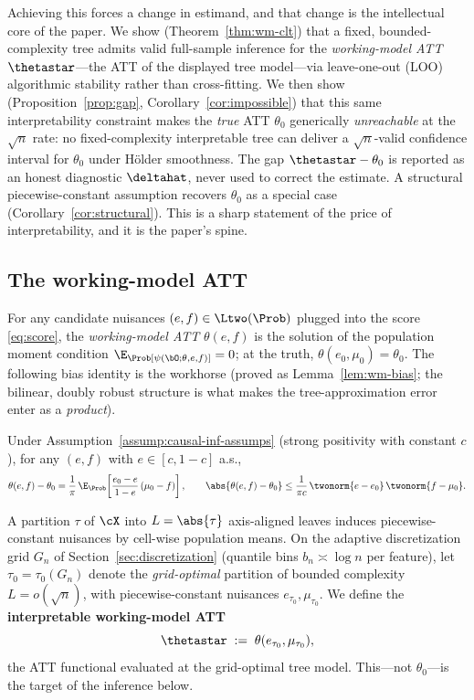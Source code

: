 Achieving this forces a change in estimand, and that change is the intellectual core
of the paper. We show (Theorem~\ref{thm:wm-clt}) that a fixed, bounded-complexity tree
admits valid full-sample inference for the \emph{working-model ATT} $\thetastar$---the
ATT of the displayed tree model---via leave-one-out (LOO) algorithmic stability
\citep{chen2022dml} rather than cross-fitting. We then show
(Proposition~\ref{prop:gap}, Corollary~\ref{cor:impossible}) that this same
interpretability constraint makes the \emph{true} ATT $\theta_0$ generically
\emph{unreachable} at the $\sqrt{n}$ rate: no fixed-complexity interpretable tree can
deliver a $\sqrt{n}$-valid confidence interval for $\theta_0$ under H\"older smoothness.
The gap $\thetastar - \theta_0$ is reported as an honest diagnostic $\deltahat$, never
used to correct the estimate. A structural piecewise-constant assumption recovers
$\theta_0$ as a special case (Corollary~\ref{cor:structural}). This is a sharp
statement of the price of interpretability, and it is the paper's spine.

\subsection{The working-model ATT}
\label{sec:wm-estimand}

For any candidate nuisances $(e, f) \in \Ltwo(\Prob)$ plugged into the score
\eqref{eq:score}, the \emph{working-model ATT} $\theta(e, f)$ is the solution of the
population moment condition $\E_\Prob[\psi(\bO; \theta, e, f)] = 0$; at the truth,
$\theta(e_0, \mu_0) = \theta_0$. The following bias identity is the workhorse
(proved as Lemma~\ref{lem:wm-bias}; the bilinear, doubly robust structure is what
makes the tree-approximation error enter as a \emph{product}).

\begin{lemma}
\label{lem:wm-bias}
Under Assumption~\ref{assump:causal-inf-assumps} (strong positivity with constant
$c$), for any $(e, f)$ with $e \in [c, 1-c]$ a.s.,
\begin{equation}
\label{eq:wm-bias}
\theta(e, f) - \theta_0
  = \frac{1}{\pi}\, \E_\Prob\!\left[ \frac{e_0 - e}{1 - e}\,(\mu_0 - f) \right],
\qquad
\abs{\theta(e, f) - \theta_0}
  \le \frac{1}{\pi c}\, \twonorm{e - e_0}\, \twonorm{f - \mu_0}.
\end{equation}
\end{lemma}

A partition $\tau$ of $\cX$ into $L = \abs{\tau}$ axis-aligned leaves induces
piecewise-constant nuisances by cell-wise population means. On the adaptive
discretization grid $G_n$ of Section~\ref{sec:discretization} (quantile bins
$b_n \asymp \log n$ per feature), let $\tau_0 = \tau_0(G_n)$ denote the
\emph{grid-optimal} partition of bounded complexity $L = o(\sqrt{n})$, with
piecewise-constant nuisances $e_{\tau_0}, \mu_{\tau_0}$. We define the
\textbf{interpretable working-model ATT}
\begin{equation}
\label{eq:thetastar}
\thetastar \;:=\; \theta(e_{\tau_0}, \mu_{\tau_0}),
\end{equation}
the ATT functional evaluated at the grid-optimal tree model. This---not $\theta_0$---is
the target of the inference below.

